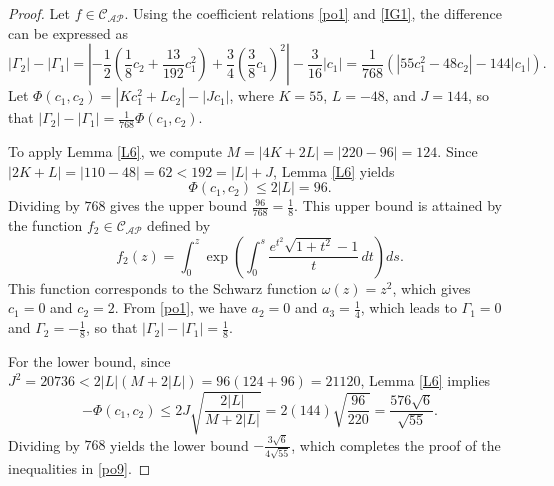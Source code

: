 \documentclass[11pt]{article}
\numberwithin{equation}{section}
\begin{document}
\begin{proof}
Let $f \in \mathcal{C}_{\mathcal{AP}}$. Using the coefficient relations \eqref{po1} and \eqref{IG1}, the difference can be expressed as
\begin{equation}\label{po10}
|\Gamma_2|-|\Gamma_1| = \left| -\frac{1}{2} \left( \frac{1}{8} c_2+\frac{13}{192}c_1^2 \right) + \frac{3}{4} \left( \frac{3}{8} c_1 \right)^2 \right| - \frac{3}{16}|c_1| = \frac{1}{768} \left( |55c_1^2-48c_2|-144|c_1| \right).
\end{equation}
Let $\Phi(c_1,c_2) = |Kc_1^2+Lc_2|-|Jc_1|$, where $K=55$, $L=-48$, and $J=144$, so that $|\Gamma_2|-|\Gamma_1| = \frac{1}{768}\Phi(c_1,c_2)$.

To apply Lemma \ref{L6}, we compute $M = |4K+2L| = |220-96| = 124$. Since $|2K+L| = |110-48| = 62 < 192 = |L|+J$, Lemma \ref{L6} yields
\[
\Phi(c_1,c_2) \le 2|L| = 96.
\]
Dividing by $768$ gives the upper bound $\frac{96}{768} = \frac{1}{8}$. This upper bound is attained by the function $f_2 \in \mathcal{C}_{\mathcal{AP}}$ defined by
\begin{equation}\label{ext2}
f_2(z) = \int_0^z \exp\left( \int_0^s \frac{e^{t^2}\sqrt{1+t^2}-1}{t}\,dt \right)ds.
\end{equation}
This function corresponds to the Schwarz function $\omega(z)=z^2$, which gives $c_1=0$ and $c_2=2$. From \eqref{po1}, we have $a_2 = 0$ and $a_3 = \frac{1}{4}$, which leads to $\Gamma_1 = 0$ and $\Gamma_2 = -\frac{1}{8}$, so that $|\Gamma_2|-|\Gamma_1| = \frac{1}{8}$.

For the lower bound, since $J^2 = 20736 < 2|L|(M+2|L|) = 96(124+96) = 21120$, Lemma \ref{L6} implies
\[
-\Phi(c_1,c_2) \le 2J \sqrt{\frac{2|L|}{M+2|L|}} = 2(144)\sqrt{\frac{96}{220}} = \frac{576\sqrt{6}}{\sqrt{55}}.
\]
Dividing by $768$ yields the lower bound $-\frac{3\sqrt{6}}{4\sqrt{55}}$, which completes the proof of the inequalities in \eqref{po9}.


\end{proof}
\end{document}
